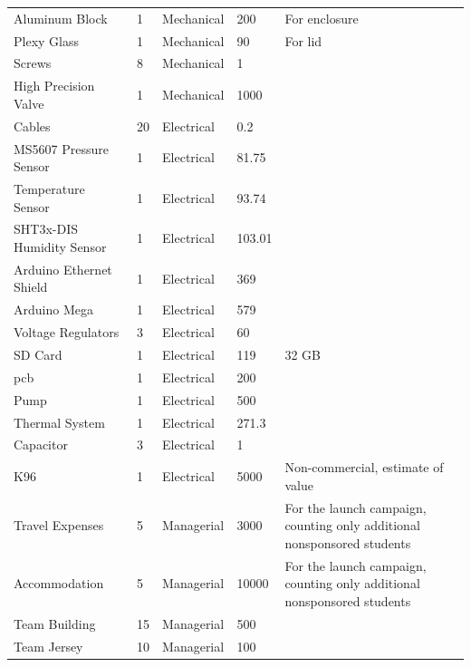 \documentclass[12pt,a4paper]{report}
\begin{document}
\begin{longtable}{p{3cm}p{1.7cm}p{2cm}p{1.5cm}p{5cm}}
Aluminum Block & 1 & Mechanical & 200 & For enclosure \\
Plexy Glass & 1 & Mechanical & 90 & For lid \\
Screws & 8 & Mechanical & 1 & \\
High Precision Valve & 1 & Mechanical & 1000 & \\
Cables & 20 & Electrical & 0.2 & \\
MS5607 Pressure Sensor & 1 & Electrical & 81.75 & \\
Temperature Sensor & 1 & Electrical & 93.74 & \\
SHT3x-DIS Humidity Sensor & 1 & Electrical & 103.01 & \\
Arduino Ethernet Shield & 1 & Electrical & 369 & \\
Arduino Mega & 1 & Electrical & 579 & \\
Voltage Regulators & 3 & Electrical & 60 & \\
SD Card & 1 & Electrical & 119 & 32 GB \\
\ac{pcb} & 1 & Electrical & 200 & \\
Pump & 1 & Electrical & 500 & \\
Thermal System & 1 & Electrical & 271.3 & \\
Capacitor & 3 & Electrical & 1 & \\
K96 & 1 & Electrical & 5000 & Non-commercial, estimate of value \\
Travel Expenses & 5 & Managerial & 3000 & For the launch campaign, counting only additional nonsponsored students \\
Accommodation & 5 & Managerial & 10000 & For the launch campaign, counting only additional nonsponsored students \\
Team Building & 15 & Managerial & 500 & \\
Team Jersey & 10 & Managerial & 100 & \\
\end{longtable}
\end{document}

